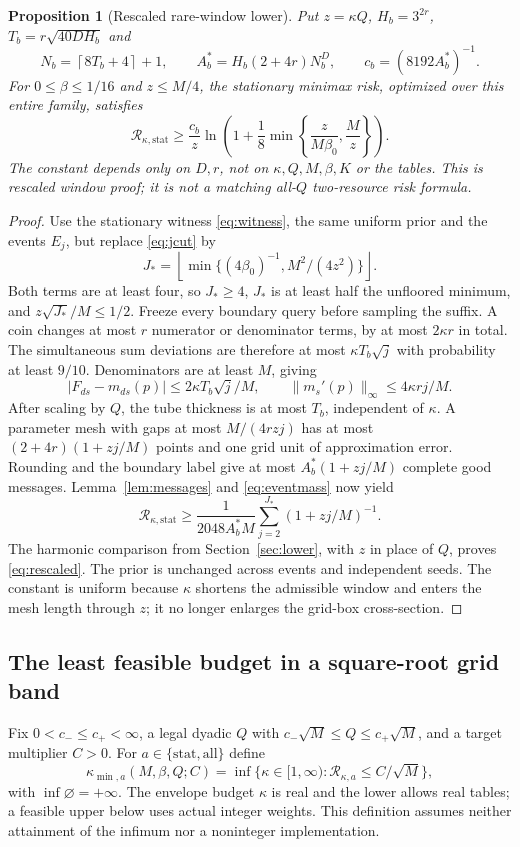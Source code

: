 \documentclass[11pt,letterpaper]{article}
\newtheorem{proposition}[theorem]{Proposition}
\theoremstyle{definition}\newtheorem{definition}[theorem]{Definition}
\theoremstyle{remark}\newtheorem{remark}[theorem]{Remark}
\newcommand{\floor}[1]{\left\lfloor #1\right\rfloor}
\newcommand{\ceil}[1]{\left\lceil #1\right\rceil}
\newcommand{\betaz}{\beta_0}
\newcommand{\Risk}{\mathcal{R}}
\begin{document}
\begin{proposition}[Rescaled rare-window lower]\label{prop:rescaled}
Put $z=\kappa Q$, $H_b=3^{2r}$, $T_b=r\sqrt{40DH_b}$ and
\[
 N_b=\ceil{8T_b+4}+1,\qquad
 A_b^*=H_b(2+4r)N_b^D,\qquad c_b=(8192A_b^*)^{-1}.
\]
For $0\le\beta\le1/16$ and $z\le M/4$, the stationary minimax risk, optimized over this entire family, satisfies
\begin{equation}\label{eq:rescaled}
 \Risk_{\kappa,\mathrm{stat}}\ge
 \frac{c_b}{z}\ln\left(1+\frac18\min\left\{\frac{z}{M\betaz},\frac Mz\right\}\right).
\end{equation}
The constant depends only on $D,r$, not on $\kappa,Q,M,\beta,K$ or the tables. This is rescaled window proof; it is not a matching all-$Q$ two-resource risk formula.
\end{proposition}
\begin{proof}
Use the stationary witness \eqref{eq:witness}, the same uniform prior and the events $E_j$, but replace \eqref{eq:jcut} by
\[
 J_*=\floor{\min\{(4\betaz)^{-1},M^2/(4z^2)\}}.
\]
Both terms are at least four, so $J_*\ge4$, $J_*$ is at least half the unfloored minimum, and $z\sqrt{J_*}/M\le1/2$. Freeze every boundary query before sampling the suffix. A coin changes at most $r$ numerator or denominator terms, by at most $2\kappa r$ in total. The simultaneous sum deviations are therefore at most $\kappa T_b\sqrt j$ with probability at least $9/10$. Denominators are at least $M$, giving
\[
 |F_{ds}-m_{ds}(p)|\le2\kappa T_b\sqrt j/M,\qquad
 \|m_s'(p)\|_\infty\le4\kappa rj/M.
\]
After scaling by $Q$, the tube thickness is at most $T_b$, independent of $\kappa$. A parameter mesh with gaps at most $M/(4rzj)$ has at most $(2+4r)(1+zj/M)$ points and one grid unit of approximation error. Rounding and the boundary label give at most $A_b^*(1+zj/M)$ complete good messages. Lemma~\ref{lem:messages} and \eqref{eq:eventmass} now yield
\[
 \Risk_{\kappa,\mathrm{stat}}\ge
 \frac1{2048A_b^*M}\sum_{j=2}^{J_*}(1+zj/M)^{-1}.
\]
The harmonic comparison from Section~\ref{sec:lower}, with $z$ in place of $Q$, proves \eqref{eq:rescaled}. The prior is unchanged across events and independent seeds. The constant is uniform because $\kappa$ shortens the admissible window and enters the mesh length through $z$; it no longer enlarges the grid-box cross-section.
\end{proof}

\subsection{The least feasible budget in a square-root grid band}
Fix $0<c_-\le c_+<\infty$, a legal dyadic $Q$ with $c_-\sqrt M\le Q\le c_+\sqrt M$, and a target multiplier $C>0$. For $a\in\{\mathrm{stat},\mathrm{all}\}$ define
\begin{equation}\label{eq:kappamin}
 \kappa_{\min,a}(M,\beta,Q;C)
 =\inf\{\kappa\in[1,\infty):\Risk_{\kappa,a}\le C/\sqrt M\},
\end{equation}
with $\inf\varnothing=+\infty$. The envelope budget $\kappa$ is real and the lower allows real tables; a feasible upper below uses actual integer weights. This definition assumes neither attainment of the infimum nor a noninteger implementation.
\end{document}
